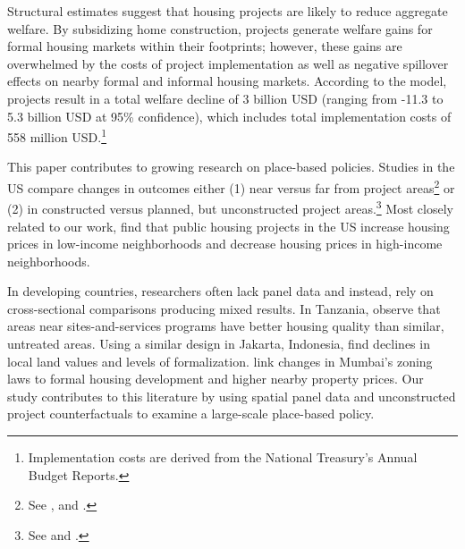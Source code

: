 \documentclass[12pt]{article}
\begin{document}
Structural estimates suggest that housing projects are likely to reduce aggregate welfare.  By subsidizing home construction, projects generate welfare gains for formal housing markets within their footprints; however, these gains are overwhelmed by the costs of project implementation as well as negative spillover effects on nearby formal and informal housing markets.  According to the model, projects result in a total welfare decline of 3 billion USD (ranging from -11.3 to 5.3 billion USD at 95\% confidence), which includes total implementation costs of 558 million USD.\footnote{Implementation costs are derived from the National Treasury's Annual Budget Reports.} 





 
This paper contributes to growing research on place-based policies.  Studies in the US compare changes in outcomes either (1) near versus far from project areas\footnote{See \cite{rossi2010housing,hornbeck2017creative}, and \cite{diamond2016wants}.} or (2) in constructed versus planned, but unconstructed project areas.\footnote{See \cite{busso2013assessing} and \cite{kline2013local}.}  Most closely related to our work, \cite{diamond2016wants} find that public housing projects in the US increase housing prices in low-income neighborhoods and decrease housing prices in high-income neighborhoods.  

In developing countries, researchers often lack panel data and instead, rely on cross-sectional comparisons producing mixed results.  In Tanzania, \cite{baruah2017planning} observe that areas near sites-and-services programs have better housing quality than similar, untreated areas.  Using a similar design in Jakarta, Indonesia, \cite{harari2018slum} find declines in local land values and levels of formalization.  \cite{gechter2018slums} link changes in Mumbai's zoning laws to formal housing development and higher nearby property prices.  Our study contributes to this literature by using spatial panel data and unconstructed project counterfactuals to examine a large-scale place-based policy.
\end{document}
